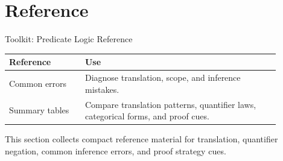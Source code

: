 \section{Reference}

\begin{toolkitbox}{Toolkit: Predicate Logic Reference}
\small
\begin{tabular}{p{0.25\linewidth} p{0.64\linewidth}}
\toprule
\textbf{Reference} & \textbf{Use} \\
\midrule
Common errors & Diagnose translation, scope, and inference mistakes. \\
Summary tables & Compare translation patterns, quantifier laws, categorical forms, and proof cues. \\
\bottomrule
\end{tabular}
\end{toolkitbox}

\begin{remark*}[Exposition]
This section collects compact reference material for translation, quantifier
negation, common inference errors, and proof strategy cues.
\end{remark*}



